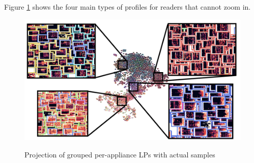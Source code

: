 Figure \ref{fig:t-sne_zoomed} shows the four main types of profiles for readers that cannot zoom in.

\begin{figure}[H] 
	\centering
	\caption{Projection of grouped per-appliance LPs with actual samples}
	\includegraphics[width=.9\textwidth]{Figures/TSNE/TSNE_PHPA/t-sne_zoomed.png}
	\label{fig:t-sne_zoomed}
\end{figure}








